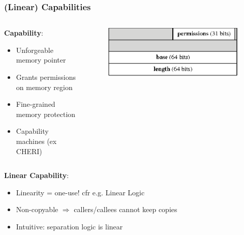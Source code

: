 \documentclass{beamer}
\begin{document}

\begin{frame}
\frametitle{(Linear) Capabilities}

\begin{columns}
\begin{column}{0.5\textwidth}
	\textbf{Capability}: %
\begin{itemize}
\item Unforgeable memory pointer
\item Grants permissions on memory region
\item Fine-grained memory protection
\item Capability machines (ex CHERI)
\end{itemize}
\end{column}
\begin{column}{0.5\textwidth}
\begin{figure}
\includegraphics[width=\linewidth]{Capability}%
\end{figure}
\end{column}
\end{columns}
\vspace{.5em}


\textbf{Linear Capability}: %
\begin{itemize}
\item Linearity = one-use! cfr e.g. Linear Logic
\item Non-copyable
$\Rightarrow$ callers/callees cannot keep copies
\item Intuitive: separation logic is linear
\end{itemize}
\end{frame}
\end{document}
